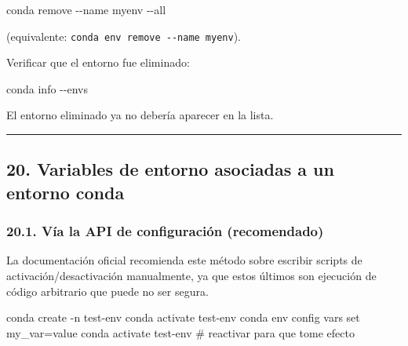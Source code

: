 \documentclass[
  doc,
  floatsintext,
  longtable,
  a4paper,
  nolmodern,
  notxfonts,
  notimes,
  12pt,
  colorlinks=true,linkcolor=blue,citecolor=blue,urlcolor=blue]{apa7}
\newenvironment{Shaded}{\begin{snugshade}}{\end{snugshade}}
\newcommand{\AttributeTok}[1]{\textcolor[rgb]{0.40,0.45,0.13}{#1}}
\newcommand{\CommentTok}[1]{\textcolor[rgb]{0.37,0.37,0.37}{#1}}
\newcommand{\ExtensionTok}[1]{\textcolor[rgb]{0.00,0.23,0.31}{#1}}
\newcommand{\NormalTok}[1]{\textcolor[rgb]{0.00,0.23,0.31}{#1}}
\begin{document}
\begin{Shaded}
\begin{Highlighting}[]
\ExtensionTok{conda}\NormalTok{ remove }\AttributeTok{{-}{-}name}\NormalTok{ myenv }\AttributeTok{{-}{-}all}
\end{Highlighting}
\end{Shaded}

(equivalente: \texttt{conda\ env\ remove\ -\/-name\ myenv}).

Verificar que el entorno fue eliminado:

\begin{Shaded}
\begin{Highlighting}[]
\ExtensionTok{conda}\NormalTok{ info }\AttributeTok{{-}{-}envs}
\end{Highlighting}
\end{Shaded}

El entorno eliminado ya no debería aparecer en la lista.

\begin{center}\rule{0.5\linewidth}{0.5pt}\end{center}

\subsection{20. Variables de entorno asociadas a un entorno
conda}\label{variables-de-entorno-asociadas-a-un-entorno-conda}

\subsubsection{20.1. Vía la API de configuración
(recomendado)}\label{vuxeda-la-api-de-configuraciuxf3n-recomendado}

La documentación oficial recomienda este método sobre escribir scripts
de activación/desactivación manualmente, ya que estos últimos son
ejecución de código arbitrario que puede no ser segura.

\begin{Shaded}
\begin{Highlighting}[]
\ExtensionTok{conda}\NormalTok{ create }\AttributeTok{{-}n}\NormalTok{ test{-}env}
\ExtensionTok{conda}\NormalTok{ activate test{-}env}
\ExtensionTok{conda}\NormalTok{ env config vars set my\_var=value}
\ExtensionTok{conda}\NormalTok{ activate test{-}env   }\CommentTok{\# reactivar para que tome efecto}
\end{Highlighting}
\end{Shaded}
\end{document}
